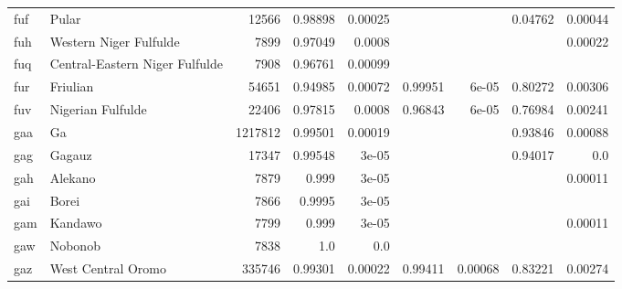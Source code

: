\documentclass[11pt]{article}
\begin{document}
\begin{table*}[h]
{\begin{tabular}{llrrrrrrr}
fuf         & Pular         & 12566         & 0.98898         & 0.00025         &          &          & 0.04762         & 0.00044         \\

fuh         & Western Niger Fulfulde         & 7899         & 0.97049         & 0.0008         &          &          &          & 0.00022         \\

fuq         & Central-Eastern Niger Fulfulde         & 7908         & 0.96761         & 0.00099         &          &          &          &          \\

fur         & Friulian         & 54651         & 0.94985         & 0.00072         & 0.99951         & 6e-05         & 0.80272         & 0.00306         \\

fuv         & Nigerian Fulfulde         & 22406         & 0.97815         & 0.0008         & 0.96843         & 6e-05         & 0.76984         & 0.00241         \\

gaa         & Ga         & 1217812         & 0.99501         & 0.00019         &          &          & 0.93846         & 0.00088         \\

gag         & Gagauz         & 17347         & 0.99548         & 3e-05         &          &          & 0.94017         & 0.0         \\

gah         & Alekano         & 7879         & 0.999         & 3e-05         &          &          &          & 0.00011         \\

gai         & Borei         & 7866         & 0.9995         & 3e-05         &          &          &          &          \\

gam         & Kandawo         & 7799         & 0.999         & 3e-05         &          &          &          & 0.00011         \\

gaw         & Nobonob         & 7838         & 1.0         & 0.0         &          &          &          &          \\

gaz         & West Central Oromo         & 335746         & 0.99301         & 0.00022         & 0.99411         & 0.00068         & 0.83221         & 0.00274         \\


\end{tabular}}
\end{table*}
\end{document}

